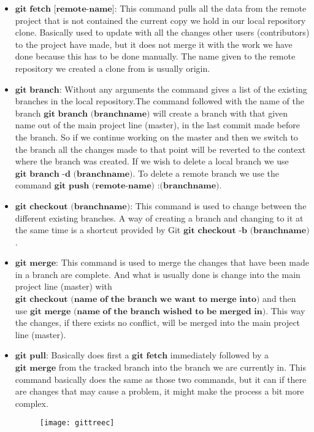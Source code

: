 \documentclass{book}
\begin{document}
\begin{itemize}
	\item $\textbf{git fetch [remote-name]:}$ This command pulls all the data from the remote project that is not contained the current copy we hold in our local repository clone. Basically used to update with all the changes other users (contributors) to the project have made, but it does not merge it with the work we have done because this has to be done manually. The name given to the remote repository we created a clone from is usually origin.
	\item $\textbf{git branch:}$  Without any arguments the command gives a list of the existing branches in the local repository.The command followed with the name of the branch $\textbf{git branch (branchname)}$ will create a branch with that given name out of the main project line (master), in the last commit made before the branch. So if we continue working on the master and then we switch to the branch all the changes made to that point will be reverted to the context where the branch was created.  If we wish to delete a local branch we use $\textbf{git branch -d (branchname)}$. To delete a remote branch we use the command $\textbf{git push (remote-name) :(branchname)}$.
	\item $\textbf{git checkout (branchname):}$ This command is used to change between the different existing branches. A way of creating a branch and changing to it at the same time is a shortcut provided by Git $\textbf{git checkout -b (branchname)}$. 
	\item $\textbf{git merge:}$ This command is used to merge the changes that have been made in a branch are complete. And what is usually done is change into the main project line (master) with $\textbf{git checkout (name of the branch we want to merge into)}$ and then use $\textbf{git merge (name of the branch wished to be merged in)}$. This way the changes, if there exists no conflict, will be merged into the main project line (master).
	\item $\textbf{git pull:}$ Basically does first a $\textbf{git fetch}$ immediately followed by a $\textbf{git merge}$ from the tracked branch into the branch we are currently in. This command basically does the same as those two commands, but it can if there are changes that may cause a problem, it might make the process a bit more complex. 

\begin{figure}[H]
\begin{center}
	\texttt{[image: gittreec]}


\end{center}
\end{figure}
\end{itemize}
\end{document}
